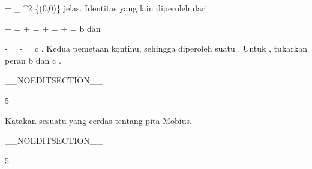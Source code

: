 {\mavergleichskettedisp
{\vergleichskette
{ \varphi \circ \psi
}
{ =} {
_{ \R^2 \setminus \{(0,0)\}  }
}
{ } {
}
{ } {
}
{ } {
}
}
{}{}{}
jelas. Identitas yang lain diperoleh dari

\mavergleichskettealign
{\vergleichskettealign
{ {  } + 
}
{ =} { {  } + {  }  
}
{ =} { {  } + {  }  
}
{ =} { {  } + {  }
}
{ =} {b
}
}
{}
{}{}
dan

\mavergleichskettedisp
{\vergleichskette
{ {  } - 
}
{ =} { {  } - {  }
}
{ =} { c
}
{ } {}
{ } {}
}
{}{}{.}
Kedua pemetaan kontinu, sehingga diperoleh suatu
.
Untuk
, tukarkan peran
\mathkor {} {b} {dan} {c} {.}

 }

__NOEDITSECTION__

{5}

{

Katakan sesuatu yang cerdas tentang pita Möbius.

}
{  }

__NOEDITSECTION__

{5}

